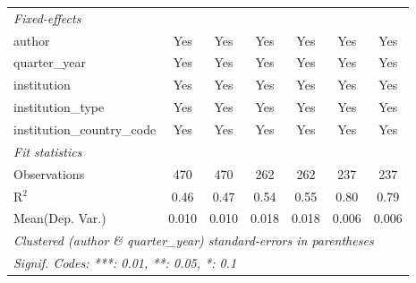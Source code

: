 \begin{tabular}{lcccccc}
   \midrule
   \emph{Fixed-effects}\\
   author                                   & Yes     & Yes     & Yes     & Yes     & Yes     & Yes\\  
   quarter\_year                            & Yes     & Yes     & Yes     & Yes     & Yes     & Yes\\  
   institution                              & Yes     & Yes     & Yes     & Yes     & Yes     & Yes\\  
   institution\_type                        & Yes     & Yes     & Yes     & Yes     & Yes     & Yes\\  
   institution\_country\_code               & Yes     & Yes     & Yes     & Yes     & Yes     & Yes\\  
   \midrule
   \emph{Fit statistics}\\
   Observations                             & 470     & 470     & 262     & 262     & 237     & 237\\  
   R$^2$                                    & 0.46    & 0.47    & 0.54    & 0.55    & 0.80    & 0.79\\  
Mean(Dep. Var.) & 0.010 & 0.010 & 0.018 & 0.018 & 0.006 & 0.006 \\
   \midrule \midrule
   \multicolumn{7}{l}{\emph{Clustered (author \& quarter\_year) standard-errors in parentheses}}\\
   \multicolumn{7}{l}{\emph{Signif. Codes: ***: 0.01, **: 0.05, *: 0.1}}\\
\end{tabular}
\par\endgroup
